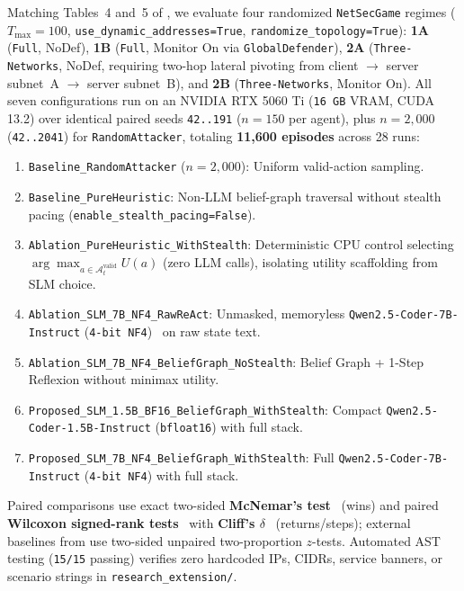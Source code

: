 \documentclass[a4paper,fleqn]{cas-dc}
\begin{document}
Matching Tables~4 and~5 of \citet{rigaki2026building}, we evaluate four randomized \texttt{NetSecGame} regimes ($T_{\max} = 100$, \texttt{use\_dynamic\_addresses=True}, \texttt{randomize\_topology=True}): \textbf{1A} (\texttt{Full}, NoDef), \textbf{1B} (\texttt{Full}, Monitor On via \texttt{GlobalDefender}), \textbf{2A} (\texttt{Three-Networks}, NoDef, requiring two-hop lateral pivoting from client $\rightarrow$ server subnet~A $\rightarrow$ server subnet~B), and \textbf{2B} (\texttt{Three-Networks}, Monitor On). All seven configurations run on an NVIDIA RTX 5060 Ti (\texttt{16 GB} VRAM, CUDA 13.2) over identical paired seeds \texttt{42..191} ($n=150$ per agent), plus $n=2{,}000$ (\texttt{42..2041}) for \texttt{RandomAttacker}, totaling \textbf{11,600 episodes} across 28 runs:
\begin{enumerate}[(1)]
    \item \texttt{Baseline\_RandomAttacker} ($n=2{,}000$): Uniform valid-action sampling.
    \item \texttt{Baseline\_PureHeuristic}: Non-LLM belief-graph traversal without stealth pacing (\texttt{enable\_stealth\_pacing=False}).
    \item \texttt{Ablation\_PureHeuristic\_WithStealth}: Deterministic CPU control selecting $\arg\max_{a \in \mathcal{A}^{\text{valid}}_t} U(a)$ (zero LLM calls), isolating utility scaffolding from SLM choice.
    \item \texttt{Ablation\_SLM\_7B\_NF4\_RawReAct}: Unmasked, memoryless \texttt{Qwen2.5-Coder-7B-Instruct} (\texttt{4-bit NF4})~\citep{hui2024qwen25coder} on raw state text.
    \item \texttt{Ablation\_\allowbreak{}SLM\_\allowbreak{}7B\_\allowbreak{}NF4\_\allowbreak{}BeliefGraph\_\allowbreak{}NoStealth}: Belief Graph + 1-Step Reflexion without minimax utility.
    \item \texttt{Proposed\_\allowbreak{}SLM\_\allowbreak{}1.5B\_\allowbreak{}BF16\_\allowbreak{}BeliefGraph\_\allowbreak{}WithStealth}: Compact \texttt{Qwen2.5-\allowbreak{}Coder-\allowbreak{}1.5B-\allowbreak{}Instruct} (\texttt{bfloat16}) with full stack.
    \item \texttt{Proposed\_\allowbreak{}SLM\_\allowbreak{}7B\_\allowbreak{}NF4\_\allowbreak{}BeliefGraph\_\allowbreak{}WithStealth}: Full \texttt{Qwen2.5-\allowbreak{}Coder-\allowbreak{}7B-\allowbreak{}Instruct} (\texttt{4-bit NF4}) with full stack.
\end{enumerate}

Paired comparisons use exact two-sided \textbf{McNemar's test}~\citep{mcnemar1947note} (wins) and paired \textbf{Wilcoxon signed-rank tests}~\citep{wilcoxon1945individual} with \textbf{Cliff's $\delta$}~\citep{cliff1993dominance} (returns/steps); external baselines from \citet{rigaki2026building} use two-sided unpaired two-proportion $z$-tests. Automated AST testing (\texttt{15/15} passing) verifies zero hardcoded IPs, CIDRs, service banners, or scenario strings in \texttt{research\_extension/}.
\end{document}
